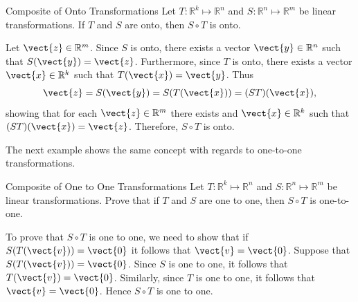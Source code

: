 \begin{example}{Composite of Onto Transformations}\label{exa:compositeonto}
Let $T: \mathbb{R}^k \mapsto \mathbb{R}^n$ and $S: \mathbb{R}^n \mapsto \mathbb{R}^m$ be linear transformations. 
If $T$ and $S$ are onto, then $S \circ T$ is onto.
\end{example}

\begin{solution}
Let $\vect{z}\in \mathbb{R}^m$.  
Since $S$ is onto, there exists a vector $\vect{y}\in \mathbb{R}^n$
such that $S(\vect{y})=\vect{z}$.
Furthermore, since $T$ is onto, there exists a vector $\vect{x}\in \mathbb{R}^k$
such that $T(\vect{x})=\vect{y}$.
Thus
\[ \vect{z} = S(\vect{y}) = S(T(\vect{x})) = (ST)(\vect{x}),\]
showing that for each $\vect{z}\in \mathbb{R}^m$ there exists and $\vect{x}\in \mathbb{R}^k$
such that $(ST)(\vect{x})=\vect{z}$.
Therefore, $S \circ T$ is onto.
\end{solution}

The next example shows the same concept with regards to one-to-one transformations. 

\begin{example}{Composite of One to One Transformations}\label{exa:compositeonetoone}
Let $T: \mathbb{R}^k \mapsto \mathbb{R}^n$ and $S: \mathbb{R}^n \mapsto \mathbb{R}^m$ be linear transformations. 
Prove that if $T$ and $S$ are one to one, then $S \circ T$ 
is one-to-one.
\end{example}

\begin{solution}
To prove that $S \circ T$ is one to one, we need to show that if $S(T (\vect{v})) = \vect{0}$ it follows that $\vect{v} = \vect{0}$. 
Suppose that  $S(T (\vect{v})) = \vect{0}$. Since $S$ is one to one, it follows that  $T (\vect{v}) = \vect{0}$. Similarly, since $T$ is one to one, it follows that $\vect{v} = \vect{0}$. Hence $S \circ T$ is one to one. 
\end{solution}